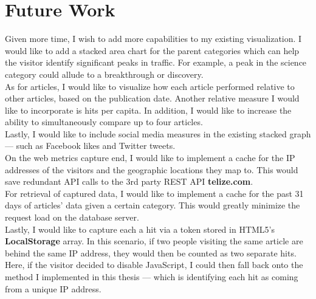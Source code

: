 \documentclass[12pt]{article}
\begin{document}
{\section{Future Work}
Given more time, I wish to add more capabilities to my existing visualization. I would like to add a stacked area chart for the parent categories which can help the visitor identify significant peaks in traffic. For example, a peak in the science category could allude to a breakthrough or discovery. \\
As for articles, I would like to visualize how each article performed relative to other articles, based on the publication date. Another relative measure I would like to incorporate is hits per capita. In addition, I would like to increase the ability to simultaneously compare up to four articles. \\
Lastly, I would like to include social media measures in the existing stacked graph --- such as Facebook likes and Twitter tweets.
\\On the web metrics capture end, I would like to implement a cache for the IP addresses of the visitors and the geographic locations they map to. This would save redundant API calls to the 3rd party REST API  \textbf{telize.com}. 
\\For retrieval of captured data, I would like to implement a cache for the past 31 days of articles' data given a certain category. This would greatly minimize the request load on the database server.
\\Lastly, I would like to capture each a hit via a token stored in HTML5's \textbf{LocalStorage} array. In this scenario, if two people visiting the same article are behind the same IP address, they would then be counted as two separate hits. Here, if the visitor decided to disable JavaScript, I could then fall back onto the method I implemented in this thesis --- which is identifying each hit as coming from a unique IP address.

\newpage

}
\end{document}
